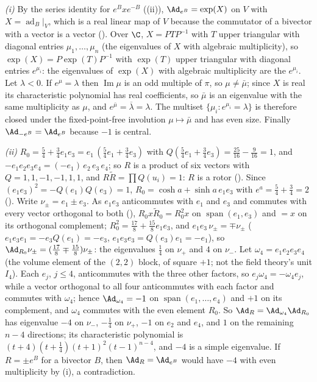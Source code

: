\emph{(i)} By the series identity for $e^{B} x e^{-B}$ ((ii)), $\Ad_{e^{B}} = \exp(X)$ on $V$ with $X = \operatorname{ad}_{B}|_{V}$, which is a real linear map of $V$ because the commutator of a bivector with a vector is a vector (). Over $\C$, $X = P T P^{-1}$ with $T$ upper triangular with diagonal entries $\mu_1, \dots, \mu_n$ (the eigenvalues of $X$ with algebraic multiplicity), so $\exp(X) = P \exp(T) P^{-1}$ with $\exp(T)$ upper triangular with diagonal entries $e^{\mu_i}$: the eigenvalues of $\exp(X)$ with algebraic multiplicity are the $e^{\mu_i}$. Let $\lambda < 0$. If $e^{\mu} = \lambda$ then $\operatorname{Im}\mu$ is an odd multiple of $\pi$, so $\mu \ne \bar\mu$; since $X$ is real its characteristic polynomial has real coefficients, so $\bar\mu$ is an eigenvalue with the same multiplicity as $\mu$, and $e^{\bar\mu} = \overline{\lambda} = \lambda$. The multiset $\{\mu_i : e^{\mu_i} = \lambda\}$ is therefore closed under the fixed-point-free involution $\mu \mapsto \bar\mu$ and has even size. Finally $\Ad_{-e^{B}} = \Ad_{e^{B}}$ because $-1$ is central.

\emph{(ii)} $R_0 = \tfrac54 + \tfrac34 e_1e_3 = e_1\,(\tfrac54 e_1 + \tfrac34 e_3)$ with $Q(\tfrac54 e_1 + \tfrac34 e_3) = \tfrac{25}{16} - \tfrac{9}{16} = 1$, and $-e_1e_2e_3e_4 = (-e_1)\,e_2\,e_3\,e_4$; so $R$ is a product of six vectors with $Q = 1, 1, -1, -1, 1, 1$, and $R\tilde R = \prod Q(u_i) = 1$: $R$ is a rotor (). Since $(e_1e_3)^{2} = -Q(e_1)Q(e_3) = 1$, $R_0 = \cosh a + \sinh a\, e_1e_3$ with $e^{a} = \tfrac54 + \tfrac34 = 2$ (). Write $\nu_{\pm} = e_1 \pm e_3$. As $e_1 e_3$ anticommutes with $e_1$ and $e_3$ and commutes with every vector orthogonal to both (), $R_0 x \tilde R_0 = R_0^{2} x$ on $\operatorname{span}(e_1, e_3)$ and $= x$ on its orthogonal complement; $R_0^{2} = \tfrac{17}{8} + \tfrac{15}{8} e_1e_3$, and $e_1e_3\,\nu_{\pm} = \mp\nu_{\pm}$ ($e_1e_3e_1 = -e_3 Q(e_1) = -e_3$, $e_1 e_3 e_3 = Q(e_3) e_1 = -e_1$), so $\Ad_{R_0}\nu_{\pm} = (\tfrac{17}{8} \mp \tfrac{15}{8})\nu_{\pm}$: the eigenvalues $\tfrac14$ on $\nu_{+}$ and $4$ on $\nu_{-}$. Let $\omega_4 = e_1e_2e_3e_4$ (the volume element of the $(2,2)$ block, of square $+1$; not the field theory's unit $I_4$). Each $e_j$, $j \le 4$, anticommutes with the three other factors, so $e_j \omega_4 = -\omega_4 e_j$, while a vector orthogonal to all four anticommutes with each factor and commutes with $\omega_4$; hence $\Ad_{\omega_4} = -1$ on $\operatorname{span}(e_1, \dots, e_4)$ and $+1$ on its complement, and $\omega_4$ commutes with the even element $R_0$. So $\Ad_R = \Ad_{\omega_4}\Ad_{R_0}$ has eigenvalue $-4$ on $\nu_{-}$, $-\tfrac14$ on $\nu_{+}$, $-1$ on $e_2$ and $e_4$, and $1$ on the remaining $n - 4$ directions; its characteristic polynomial is $(t + 4)(t + \tfrac14)(t + 1)^{2}(t - 1)^{n - 4}$, and $-4$ is a simple eigenvalue. If $R = \pm e^{B}$ for a bivector $B$, then $\Ad_R = \Ad_{e^{B}}$ would have $-4$ with even multiplicity by (i), a contradiction.

